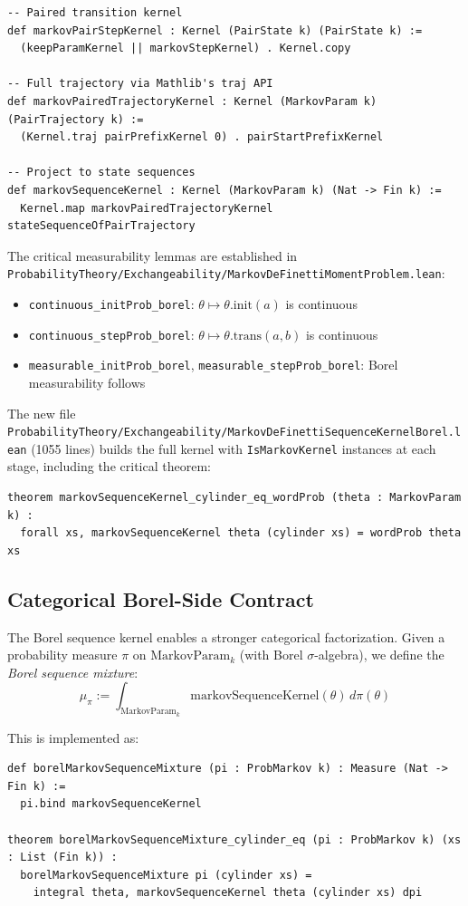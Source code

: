 \documentclass[11pt,a4paper]{article}
\theoremstyle{definition}
\begin{document}
\begin{lstlisting}
-- Paired transition kernel
def markovPairStepKernel : Kernel (PairState k) (PairState k) :=
  (keepParamKernel || markovStepKernel) . Kernel.copy

-- Full trajectory via Mathlib's traj API
def markovPairedTrajectoryKernel : Kernel (MarkovParam k) (PairTrajectory k) :=
  (Kernel.traj pairPrefixKernel 0) . pairStartPrefixKernel

-- Project to state sequences
def markovSequenceKernel : Kernel (MarkovParam k) (Nat -> Fin k) :=
  Kernel.map markovPairedTrajectoryKernel stateSequenceOfPairTrajectory
\end{lstlisting}

The critical measurability lemmas are established in
\texttt{ProbabilityTheory/Exchangeability/MarkovDeFinettiMomentProblem.lean}:
\begin{itemize}
\item \texttt{continuous\_initProb\_borel}: $\theta \mapsto \theta.\mathrm{init}(a)$ is continuous
\item \texttt{continuous\_stepProb\_borel}: $\theta \mapsto \theta.\mathrm{trans}(a,b)$ is continuous
\item \texttt{measurable\_initProb\_borel}, \texttt{measurable\_stepProb\_borel}: Borel measurability follows
\end{itemize}

The new file \texttt{ProbabilityTheory/Exchangeability/MarkovDeFinettiSequenceKernelBorel.lean} (1055 lines)
builds the full kernel with \texttt{IsMarkovKernel} instances at each stage,
including the critical theorem:
\begin{lstlisting}
theorem markovSequenceKernel_cylinder_eq_wordProb (theta : MarkovParam k) :
  forall xs, markovSequenceKernel theta (cylinder xs) = wordProb theta xs
\end{lstlisting}

\subsection{Categorical Borel-Side Contract}

The Borel sequence kernel enables a stronger categorical factorization. Given
a probability measure $\pi$ on $\mathrm{MarkovParam}_k$ (with Borel
$\sigma$-algebra), we define the \emph{Borel sequence mixture}:
\[
\mu_\pi := \int_{\mathrm{MarkovParam}_k} \mathrm{markovSequenceKernel}(\theta)\, d\pi(\theta)
\]

This is implemented as:
\begin{lstlisting}
def borelMarkovSequenceMixture (pi : ProbMarkov k) : Measure (Nat -> Fin k) :=
  pi.bind markovSequenceKernel

theorem borelMarkovSequenceMixture_cylinder_eq (pi : ProbMarkov k) (xs : List (Fin k)) :
  borelMarkovSequenceMixture pi (cylinder xs) =
    integral theta, markovSequenceKernel theta (cylinder xs) dpi
\end{lstlisting}
\end{document}
